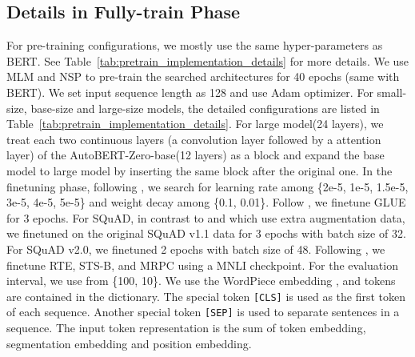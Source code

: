 \documentclass[letterpaper]{article} \usepackage{aaai22}  \usepackage{times}  \usepackage{helvet}  \usepackage{courier}  \usepackage[hyphens]{url}  \usepackage{graphicx} \urlstyle{rm} \def\UrlFont{\rm}  \usepackage{natbib}  \usepackage{caption} \DeclareCaptionStyle{ruled}{labelfont=normalfont,labelsep=colon,strut=off} \frenchspacing  \setlength{\pdfpagewidth}{8.5in}  \setlength{\pdfpageheight}{11in}  \usepackage{algorithm}
\begin{document}
\subsection{Details in Fully-train Phase}
For pre-training configurations, we mostly use the same hyper-parameters as BERT. See Table~\ref{tab:pretrain_implementation_details} for more details. We use MLM and NSP to pre-train the searched architectures for 40 epochs (same with BERT). We set input sequence length as 128 and use Adam\citep{DBLP:adam} optimizer. For small-size, base-size and large-size models, the detailed configurations are listed in Table~\ref{tab:pretrain_implementation_details}. For large model(24 layers), we treat each two continuous layers (a convolution layer followed by a attention layer)  of the AutoBERT-Zero-base(12 layers) as a block and expand the base model to large model by inserting the same block after the original one.
In the finetuning phase, following \citep{devlin2019bert, jiang2020convbert}, we search for learning rate among \{2e-5, 1e-5, 1.5e-5, 3e-5, 4e-5, 5e-5\} and weight decay among \{0.1, 0.01\}. Follow \cite{devlin2019bert,jiang2020convbert}, we finetune GLUE for 3 epochs. For SQuAD, in contrast to \cite{lan2019albert} and \cite{devlin2019bert} which use extra augmentation data, we finetuned on the original SQuAD v1.1 data for 3 epochs with batch size of 32. For SQuAD v2.0, we finetuned 2 epochs with batch size of 48. Following \citep{liu2019roberta}, we finetune RTE, STS-B, and MRPC using a MNLI checkpoint. For the evaluation interval, we use from \{100, 10\}.  We use the WordPiece embedding \citep{wu2016google}, and  tokens are
contained in the dictionary. The special token {\tt [CLS]} is used as the first
token of each sequence. Another special token {\tt [SEP]} is used to separate
sentences in a sequence. The input token representation is the sum of token embedding, segmentation embedding and position embedding.


\begin{table}[h]
\begin{center}
\centering{}
\caption{{More comparison about model latency and memory. GLUE is reported on dev set. }}\label{tab:latency}
\end{center}
\end{table}
\end{document}
